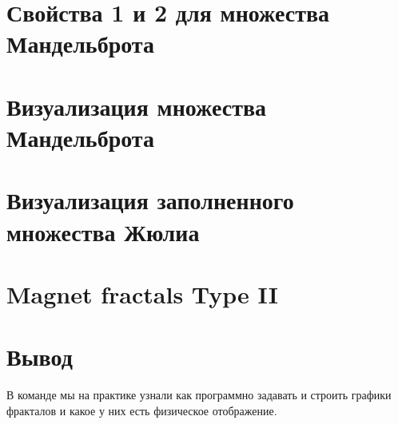 \documentclass[a4paper,12pt]{article}
\begin{document}

\newpage
\tableofcontents
\newpage

\section{Свойства 1 и 2 для множества Мандельброта}

\FloatBarrier
\newpage

\section{ Визуализация множества Мандельброта}

\FloatBarrier
\newpage

\section{ Визуализация заполненного множества
Жюлиа}

\FloatBarrier
\newpage

\section{Magnet fractals Type II}

\FloatBarrier
\newpage
\section{Вывод}
В команде мы на практике узнали как программно задавать и строить графики фракталов и какое у них есть физическое отображение.
\end{document}
